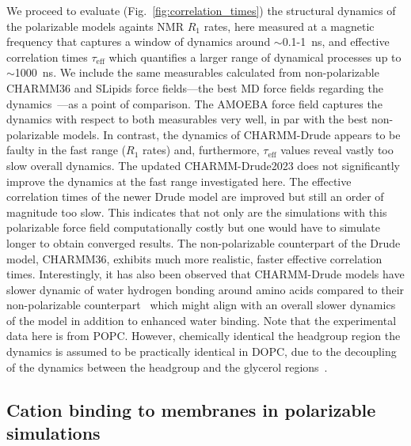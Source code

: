 \documentclass[journal=jacsat,manuscript=article,layout=singlecolumn]{achemso}
\begin{document}
We proceed to evaluate (Fig.~\ref{fig:correlation_times}) the structural dynamics of the polarizable models againts NMR $R_{1}$ rates, here measured at a magnetic frequency that captures a window of dynamics around $\sim$0.1-1~ns, and effective correlation times $\tau_{\mathrm{eff}}$ which quantifies a larger range of dynamical processes up to $\sim$1000~ns. We include the same measurables calculated from non-polarizable CHARMM36 and SLipids force fields---the best MD force fields regarding the dynamics~\cite{Antila2021}---as a point of comparison. The AMOEBA force field captures the dynamics with respect to both measurables very well,  in par with the best non-polarizable models. In contrast, the dynamics of CHARMM-Drude appears to be faulty in the fast range ($R_{1}$ rates) and, furthermore, $\tau_{\mathrm{eff}}$ values reveal vastly too slow overall dynamics. The updated CHARMM-Drude2023 does not significantly improve the dynamics at the fast range investigated here. The effective correlation times of the newer Drude model are improved but still an order of magnitude too slow. This indicates that not only are the simulations with this polarizable force field computationally costly but one would have to simulate longer to obtain converged results. The non-polarizable counterpart of the Drude model, CHARMM36, exhibits much more realistic, faster effective correlation times. Interestingly, it has also been observed that CHARMM-Drude models have slower dynamic of water hydrogen bonding around amino acids compared to their non-polarizable counterpart~\cite{Ngo2019} which might align with an overall slower dynamics of the model in addition to enhanced water binding. Note that the experimental data here is from POPC. However, chemically identical the headgroup region the dynamics is assumed to be practically identical in DOPC, due to the decoupling of the dynamics between the headgroup and the glycerol regions~\cite{Antila2022rot, Klauda08}.

\subsection{Cation binding to membranes in polarizable simulations}
\end{document}
